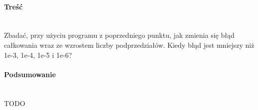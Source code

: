 \paragraph{Treść}~\\
Zbadać, przy użyciu programu z poprzedniego punktu, jak zmienia się błąd całkowania wraz ze wzrostem liczby podprzedziałów.
Kiedy błąd jest mniejszy niż 1e-3, 1e-4, 1e-5 i 1e-6?

\paragraph{Podsumowanie}~\\
TODO
